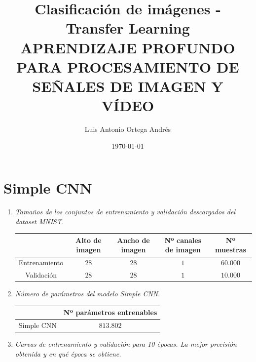 \documentclass[11pt]{article}
\author{Luis Antonio Ortega Andrés}
\date{\today}
\title{Clasificación de imágenes - Transfer Learning\\\medskip
\large APRENDIZAJE PROFUNDO PARA PROCESAMIENTO DE SEÑALES DE IMAGEN Y VÍDEO}
\begin{document}
\maketitle

\section{Simple CNN}
\begin{enumerate}
    \item \emph{Tamaños de los conjuntos de entrenamiento y validación descargados del \emph{dataset} MNIST.}

        \begin{table}[H]
            \centering
            \begin{tabular}{c|cccc}
                \textbf{}     & \textbf{Alto de imagen} & \textbf{Ancho de imagen} & \textbf{Nº canales de imagen} & \textbf{Nº muestras} \\ \hline
                Entrenamiento & \( 28 \)   & \( 28 \)     &  \( 1 \)    &   \( 60.000 \)    \\
                Validación    & \( 28 \)   & \( 28 \)     &  \( 1 \)    &   \( 10.000 \)    \\
            \end{tabular}
        \end{table}
    \item \emph{Número de parámetros del modelo Simple CNN}.
        \begin{table}[H]
            \centering
            \begin{tabular}{c|c}
                           & \textbf{Nº parámetros entrenables}  \\ \hline
                Simple CNN &      \(813.802   \)                  \\
            \end{tabular}
        \end{table}

    \item \emph{Curvas de entrenamiento y validación para 10 épocas. La mejor precisión obtenida y en qué época se obtiene.}
        


\end{enumerate}
\end{document}

